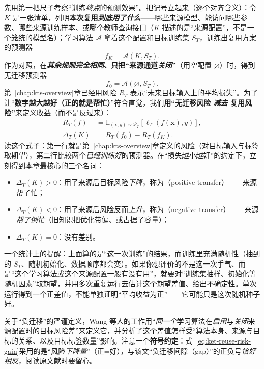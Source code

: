 先用第一把尺子考察“训练\emph{终点}的预测效果”。把记号立起来（逐个对齐含义）：令 $K$ 是一张清单，列明\textbf{本次复用\emph{到底用了什么}}——哪些来源模型、能访问哪些参数、哪些来源训练样本、或哪个教师查询接口（$K$ 描述的是“来源配置”，不是一个笼统的模型名）；学习算法 $\mathcal A$ 拿着这个配置和目标训练集 $S_T$，训练出复用方案的预测器
\[ f_K=\mathcal A(K,S_T). \]
作为对照，在\textbf{\emph{其余规则完全相同}、只把“来源通道\emph{关闭}”}（用空配置 $\varnothing$）时，得到无迁移预测器
\[ f_0=\mathcal A(\varnothing,S_T). \]
第~\ref{chap:kts-overview}章已经用风险 $R_T$ 表示“未来目标输入上的平均损失”。为了让“\textbf{数字越大越好（正的就是帮忙）}”符合直觉，我们\textbf{用“无迁移风险 \emph{减去} 复用风险”}来定义收益（而不是反过来）：
\begin{equation}
  \begin{aligned}
    R_T(f)&=\mathbb E_{(\bm{x},y)\sim\mathcal P_T}
      [\ell_T(f(\bm{x}),y)],\\
    \Delta_T(K)&=R_T(f_0)-R_T(f_K).
  \end{aligned}
  \label{eq:ket-reuse-risk-gain}
\end{equation}
读这个式子：第一行就是第~\ref{chap:kts-overview}章定义的风险（对目标输入与标签取期望），第二行比较两个\emph{已经训练好}的预测器。在“损失越小越好”的约定下，立刻得到本章最核心的三个名词：
\begin{itemize}\item $\Delta_T(K)>0$：用了来源后目标风险\emph{下降}，称为（positive transfer）——来源帮了忙；\item $\Delta_T(K)<0$：用了来源后风险反而\emph{上升}，称为（negative transfer）——来源\emph{帮了倒忙}（旧知识把优化带偏、或占据了容量）；\item $\Delta_T(K)=0$：没有差别。\end{itemize}
一个统计上的提醒：上面算的是“这一次训练”的结果，而训练里充满随机性（抽到的 $S_T$、随机初始化、数据顺序都会变）。如果你想评价的不是这一次手气、而是“这个学习算法或这个来源配置一般有没有用”，就要对“训练集抽样、初始化等随机因素”取期望，并用多次重复运行去估计这个期望差值、给出不确定性。单次运行得到一个正差值，不能单独证明“平均收益为正”——它可能只是这次随机种子好。

关于“负迁移”的严谨定义，Wang 等人的工作用“\emph{同一个}学习算法在\emph{启用}与\emph{关闭}来源配置时的目标风险差”来定义它，并分析了这个差值怎样受“算法本身、来源与目标的关系、以及目标标签数量”影响。注意一个\textbf{符号约定}：式~\eqref{eq:ket-reuse-risk-gain}采用的是“风险\emph{下降量}”（正=好），与该文“负迁移间隙（gap）”的正负号\emph{恰好相反}，阅读原文献时要留心。

